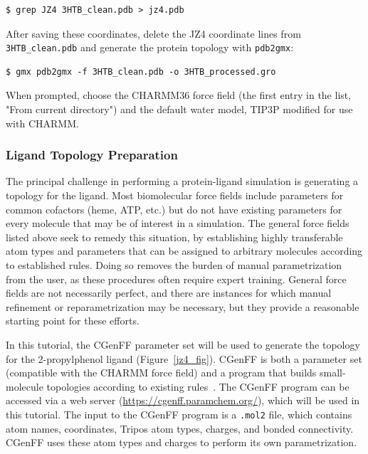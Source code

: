 \documentclass[9pt,tutorial,pubversion]{livecoms}
\begin{document}
\begin{lstlisting}
$ grep JZ4 3HTB_clean.pdb > jz4.pdb
\end{lstlisting}

After saving these coordinates, delete the JZ4 coordinate lines from \texttt{3HTB\_clean.pdb} and generate the protein topology with \texttt{pdb2gmx}:

\begin{lstlisting}
$ gmx pdb2gmx -f 3HTB_clean.pdb -o 3HTB_processed.gro
\end{lstlisting}

When prompted, choose the CHARMM36 force field (the first entry in the list, "From current directory") and the default water model, TIP3P modified for use with CHARMM.

\subsubsection{Ligand Topology Preparation} \label{complex_lig_top}

The principal challenge in performing a protein-ligand simulation is generating a topology for the ligand. Most biomolecular force fields include parameters for common cofactors (heme, ATP, etc.) but do not have existing parameters for every molecule that may be of interest in a simulation. The general force fields listed above seek to remedy this situation, by establishing highly transferable atom types and parameters that can be assigned to arbitrary molecules according to established rules. Doing so removes the burden of manual parametrization from the user, as these procedures often require expert training. General force fields are not necessarily perfect, and there are instances for which manual refinement or reparametrization may be necessary, but they provide a reasonable starting point for these efforts.

In this tutorial, the CGenFF parameter set will be used to generate the topology for the 2-propylphenol ligand (Figure~\ref{jz4_fig}). CGenFF is both a parameter set (compatible with the CHARMM force field) and a program that builds small-molecule topologies according to existing rules~\cite{Vanommeslaeghe2012a,Vanommeslaeghe2012b}. The CGenFF program can be accessed via a web server (\url{https://cgenff.paramchem.org/}), which will be used in this tutorial. The input to the CGenFF program is a \texttt{.mol2} file, which contains atom names, coordinates, Tripos atom types, charges, and bonded connectivity. CGenFF uses these atom types and charges to perform its own parametrization.
\end{document}
